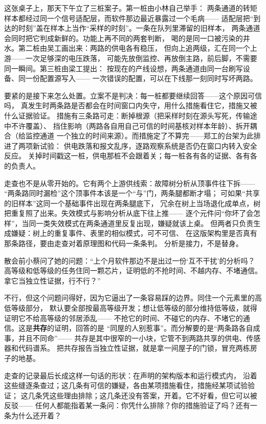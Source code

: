 这张桌子上，那天下午立了三桩案子。第一桩由小林自己举手：
两条通道的转矩样本都经过同一个信号适配层，而软件那边最近暴露过一个毛病——
适配层把“到达的时刻”盖在样本上当作“采样的时刻”。一条在队列里滞留的旧样本，
两条通道会同时把它判成新鲜的。功能上再不同的两套判断，
喝的是同一口被污染的井水。第二桩由吴工画出来：两路的供电各有稳压，
但向上追两级，汇在同一个上游——一次足够深的电压跌落，
可能先放倒监控、再放倒主路，前后脚，不需要同一瞬间。第三桩由梁工提出：
按现在的产线设想，两条通道由同一台刷写设备、同一份配置源写入——
一次错误的配置，可以在下线那一刻同时写坏两路。

要紧的是接下来怎么处置。立案不是判决：每一桩都要继续回答——这个原因可信吗，
真发生时两条路是否都会在时间窗口内失守，用什么措施看住它，措施又被什么证据验证。
措施有三条路可走：断掉根源（把采样时刻在源头写死，传输途中不许覆盖）、
挡住影响（两路各自用自己可信的时间基核对样本年龄）、拆开耦合（给监控通道
一个独立的时间来源）。而措施定了不算完——郑工的台架为此排进了两项新试验：
供电跌落和报文乱序，逐路观察系统是否仍在窗口内转入安全反应。
关掉时间戳这一桩，供电那桩不会跟着关；每一桩各有各的证据、各有各的负责人。

走查也不是从零开始的。它有两个上游供线索：故障树分析从顶事件往下拆——
“两条路同时漏检”这个顶事件本该是一个“与”门，两条腿都断才塌；
可如果“共享的旧样本”这同一个基础事件出现在两条腿底下，
冗余在树上当场退化成单点，树把重复照了出来。失效模式与影响分析从底下往上推——
逐个元件问“你坏了会怎样”，当同一类失效模式在两条通道里反复出现，嫌疑就该上桌。
但两者只负责生成嫌疑：树上的重复事件、表里的相似模式，可不可信、
在这版架构里是否真有那条路径，要由走查对着原理图和代码一条条判。
分析是接力，不是替身。

散会前小蔡问了她的问题：“上个月软件那边不是出过一份‘互不干扰’的分析吗？
高等级和低等级的任务住同一颗芯片，证明低的不抢时间、不越内存、不堵通信。
拿它当独立性证据，行不行？”

不行，但这个问题问得好，因为它逼出了一条容易踩的边界。同住一个元素里的高低等级部分，
默认要全部按最高等级开发；想让低等级的部分维持低等级，就得证明它不给高等级的邻居添乱——
不抢它的时间、不碰它的内存、不堵它的通信。这是\textbf{共存}的证明，回答的是
“同屋的人别惹事”。而分解要的是“两条路各自成事，并且不同命”——
共存是其中很窄的一小块，它管不到两路共享的供电、传感器和代码谱系。
把共存报告当独立性证据，就是拿一间屋子的门锁，冒充两栋房子的地基。

走查的记录最后长成这样一句话的形状：在声明的架构版本和运行模式内，
沿着这些缝逐条查过；这几条有可信的嫌疑，各由某项措施看住，措施经某项试验验证；
这几条凭这些理由排除；这几条还没有答案，开着。它不好看，但它可以被反驳——
任何人都能指着某一条问：你凭什么排除？你的措施验证了吗？还有一条为什么还开着？

